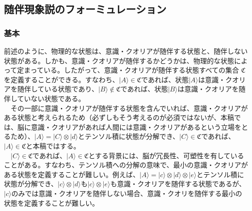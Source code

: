 \subsection{随伴現象説のフォーミュレーション}
\subsubsection{基本}
前述のように、物理的な状態は、意識・クオリアが随伴する状態と、随伴しない状態がある。しかも、意識・クオリアが随伴するかどうかは、物理的な状態によって定まっている。したがって、意識・クオリアが随伴する状態すべての集合 $\mathfrak{C}$ を定義することができる。すなわち、$|A\rangle \in \mathfrak{C}$であれば、状態$|A\rangle$は意識・クオリアを随伴している状態であり、$|B\rangle \notin \mathfrak{C}$であれば、状態$|B\rangle$は意識・クオリアを随伴していない状態である。\\
　その一部に意識・クオリアが随伴する状態を含んでいれば、意識・クオリアがある状態と考えられるため（必ずしもそう考えるのが必須ではないが、本稿では、脳に意識・クオリアがあれば人間には意識・クオリアがあるという立場をとるため）、$|A\rangle = |C\rangle \otimes |d\rangle$とテンソル積に状態が分解でき、$|C\rangle\in\mathfrak{C}$であれば、$|A\rangle\in\mathfrak{C}$と本稿ではする。\\
　$|C\rangle\in\mathfrak{C}$であれば、$|A\rangle\in\mathfrak{C}$とする背景には、脳が冗長性、可塑性を有していることがある。すなわち、テンソル積への分解の意味で、最小の意識・クオリアがある状態を定義することが難しい。例えば、$|A\rangle = |c\rangle \otimes |d\rangle \otimes |e\rangle$とテンソル積に状態が分解でき、$|c\rangle \otimes |d\rangle$も$|c\rangle \otimes |e\rangle$も意識・クオリアを随伴する状態であるが、$|c\rangle$のみでは意識・クオリアを随伴しない場合、意識・クオリを随伴する最小の状態を定義することが難しい。